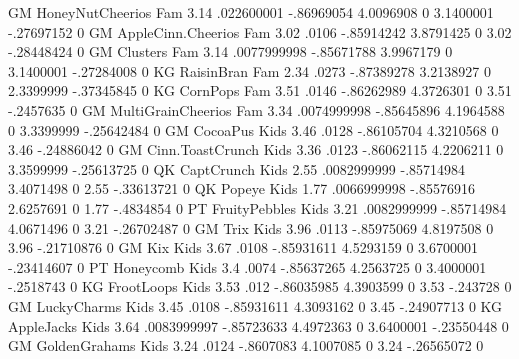 GM	HoneyNutCheerios	Fam	3.14	.022600001	-.86969054	4.0096908	0	3.1400001	-.27697152	0
GM	AppleCinn.Cheerios	Fam	3.02	.0106	-.85914242	3.8791425	0	3.02	-.28448424	0
GM	Clusters	Fam	3.14	.0077999998	-.85671788	3.9967179	0	3.1400001	-.27284008	0
KG	RaisinBran	Fam	2.34	.0273	-.87389278	3.2138927	0	2.3399999	-.37345845	0
KG	CornPops	Fam	3.51	.0146	-.86262989	4.3726301	0	3.51	-.2457635	0
GM	MultiGrainCheerios	Fam	3.34	.0074999998	-.85645896	4.1964588	0	3.3399999	-.25642484	0
GM	CocoaPus	Kids	3.46	.0128	-.86105704	4.3210568	0	3.46	-.24886042	0
GM	Cinn.ToastCrunch	Kids	3.36	.0123	-.86062115	4.2206211	0	3.3599999	-.25613725	0
QK	CaptCrunch	Kids	2.55	.0082999999	-.85714984	3.4071498	0	2.55	-.33613721	0
QK	Popeye	Kids	1.77	.0066999998	-.85576916	2.6257691	0	1.77	-.4834854	0
PT	FruityPebbles	Kids	3.21	.0082999999	-.85714984	4.0671496	0	3.21	-.26702487	0
GM	Trix	Kids	3.96	.0113	-.85975069	4.8197508	0	3.96	-.21710876	0
GM	Kix	Kids	3.67	.0108	-.85931611	4.5293159	0	3.6700001	-.23414607	0
PT	Honeycomb	Kids	3.4	.0074	-.85637265	4.2563725	0	3.4000001	-.2518743	0
KG	FrootLoops	Kids	3.53	.012	-.86035985	4.3903599	0	3.53	-.243728	0
GM	LuckyCharms	Kids	3.45	.0108	-.85931611	4.3093162	0	3.45	-.24907713	0
KG	AppleJacks	Kids	3.64	.0083999997	-.85723633	4.4972363	0	3.6400001	-.23550448	0
GM	GoldenGrahams	Kids	3.24	.0124	-.8607083	4.1007085	0	3.24	-.26565072	0
